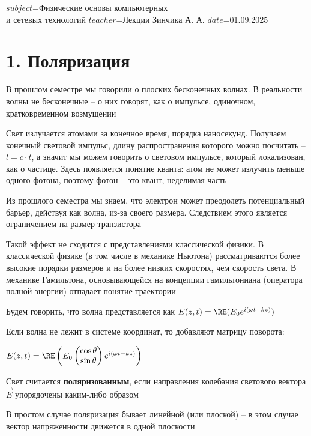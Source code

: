 $subject$=Физические основы компьютерных \\ и сетевых технологий
$teacher$=Лекции Зинчика А. А.
$date$=01.09.2025

\section{1. Поляризация}

В прошлом семестре мы говорили о плоских бесконечных волнах. В реальности волны не бесконечные -- о них говорят, как о импульсе, одиночном, кратковременном возмущении

Свет излучается атомами за конечное время, порядка наносекунд. Получаем конечный световой импульс, длину распространения которого можно посчитать -- $l = c \cdot t$, а значит мы можем говорить о световом импульсе, который локализован, как о частице. Здесь появляется понятие кванта: атом не может излучить меньше одного фотона, поэтому фотон -- это квант, неделимая часть

Из прошлого семестра мы знаем, что электрон может преодолеть потенциальный барьер, действуя как волна, из-за своего размера. Следствием этого является ограничением на размер транзистора

Такой эффект не сходится с представлениями классической физики. В классической физике (в том числе в механике Ньютона) рассматриваются более высокие порядки размеров и на более низких скоростях, чем скорость света.
В механике Гамильтона, основывающейся на концепции гамильтониана (оператора полной энергии) отпадает понятие траектории

\mediumvspace

Будем говорить, что волна представляется как $E(z, t) = \RE(E_0 e^{i(\omega t - kz)})$

Если волна не лежит в системе координат, то добавляют матрицу поворота: 

$E(z, t) = \RE\left(E_0 \begin{pmatrix}\cos \theta \\ \sin \theta \end{pmatrix} e^{i(\omega t - kz)}\right)$

\smallvspace

Свет считается \textbf{поляризованным}, если направления колебания светового вектора $\vec E$ упорядочены каким-либо образом


В простом случае поляризация бывает линейной (или плоской) -- в этом случае вектор напряженности движется в одной плоскости

